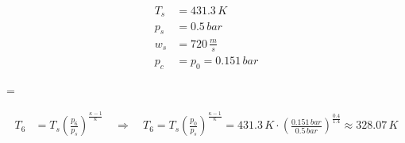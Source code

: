 \begin{align*}
T_s &= 431.3 \, K \\
p_s &= 0.5 \, bar \\
w_s &= 720 \, \frac{m}{s} \\
p_c &= p_0 = 0.151 \, bar
\end{align*}

 \quad {} = 

\begin{align*}
T_6 &= T_s \left( \frac{p_6}{p_s} \right)^{\frac{\kappa - 1}{\kappa}} \quad \Rightarrow \quad T_6 = T_s \left( \frac{p_0}{p_s} \right)^{\frac{\kappa - 1}{\kappa}} = 431.3 \, K \cdot \left( \frac{0.151 \, bar}{0.5 \, bar} \right)^{\frac{0.4}{1.4}} \approx 328.07 \, K
\end{align*}

